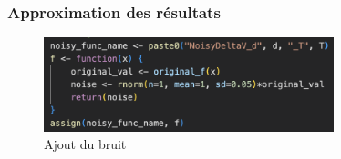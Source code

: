 \documentclass{beamer}
\begin{document}
\begin{frame}
\frametitle{Approximation des résultats}

\begin{figure}
\includegraphics[width=0.75\textwidth]{Fig/bruit.png}
\caption{Ajout du bruit}
\end{figure}

\end{frame}
\end{document}
